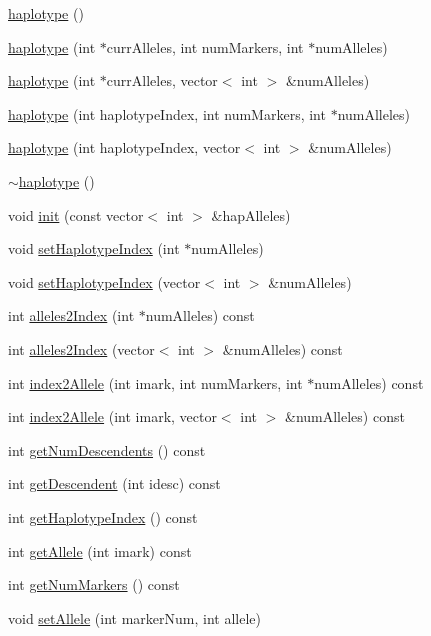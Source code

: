 \begin{DoxyCompactItemize}
\item 
\hyperlink{classhaplotype_a5694859723a1ebc9a59a14d751a5a567}{haplotype} ()
\item 
\hyperlink{classhaplotype_a63fed0a74374b6ff6737d50ef86b108e}{haplotype} (int $\ast$currAlleles, int numMarkers, int $\ast$numAlleles)
\item 
\hyperlink{classhaplotype_a0a832821c6cfda47917099f2ed923dae}{haplotype} (int $\ast$currAlleles, vector$<$ int $>$ \&numAlleles)
\item 
\hyperlink{classhaplotype_ac1f66d31cafa6ad79b293fb54268249e}{haplotype} (int haplotypeIndex, int numMarkers, int $\ast$numAlleles)
\item 
\hyperlink{classhaplotype_aff032acba0888901b10d61fc4652fbb4}{haplotype} (int haplotypeIndex, vector$<$ int $>$ \&numAlleles)
\item 
\hyperlink{classhaplotype_abc8ff34eefdfb6d4affe2a8a3a4dae5d}{$\sim$haplotype} ()
\item 
void \hyperlink{classhaplotype_a9e5a39c538681cb99c39e0c2d2627673}{init} (const vector$<$ int $>$ \&hapAlleles)
\item 
void \hyperlink{classhaplotype_a84a5c1e79a3d9233ae1111c6027256e8}{setHaplotypeIndex} (int $\ast$numAlleles)
\item 
void \hyperlink{classhaplotype_aa4aa7f5546b0e858e53992b20771ecaa}{setHaplotypeIndex} (vector$<$ int $>$ \&numAlleles)
\item 
int \hyperlink{classhaplotype_a4577de9a606d1020b527cddbe1d024f2}{alleles2Index} (int $\ast$numAlleles) const 
\item 
int \hyperlink{classhaplotype_ad03ae71768c3d20f9c1a34e8968c46ae}{alleles2Index} (vector$<$ int $>$ \&numAlleles) const 
\item 
int \hyperlink{classhaplotype_a863464fe488a5dc02f31a4c82c960ff5}{index2Allele} (int imark, int numMarkers, int $\ast$numAlleles) const 
\item 
int \hyperlink{classhaplotype_ae473fca152c95fe3a85cfa97f74cdd92}{index2Allele} (int imark, vector$<$ int $>$ \&numAlleles) const 
\item 
int \hyperlink{classhaplotype_a32e5fba880989c2e9524a0319263221c}{getNumDescendents} () const 
\item 
int \hyperlink{classhaplotype_ae5af7d8a6f4b65d0bdd705f6e1086203}{getDescendent} (int idesc) const 
\item 
int \hyperlink{classhaplotype_af843dcdcb8417a6cd0da7518e149f5c4}{getHaplotypeIndex} () const 
\item 
int \hyperlink{classhaplotype_a75e063cfed5451f48a6357b3c683d5ab}{getAllele} (int imark) const 
\item 
int \hyperlink{classhaplotype_a7bcedee62c18d3b06750b86413798af0}{getNumMarkers} () const 
\item 
void \hyperlink{classhaplotype_a74f664299f5a379138fd3aadbedca66c}{setAllele} (int markerNum, int allele)
\end{DoxyCompactItemize}


